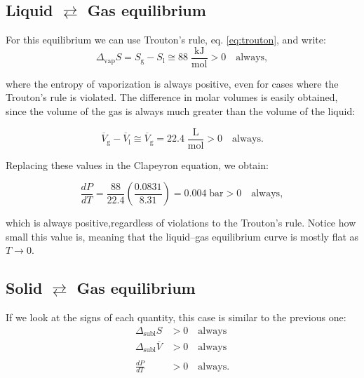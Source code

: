 \documentclass[
  9pt,
]{extbook}
\theoremstyle{definition}
\theoremstyle{definition}
\theoremstyle{definition}
\theoremstyle{definition}
\theoremstyle{remark}
\begin{document}
\subsection{\texorpdfstring{Liquid \(\rightleftarrows\) Gas equilibrium}{Liquid \textbackslash rightleftarrows Gas equilibrium}}\label{liquid-rightleftarrows-gas-equilibrium}

For this equilibrium we can use Trouton's rule, eq. \eqref{eq:trouton}, and write:
\begin{equation}
\Delta_{\text{vap}} S = S_{\text{g}}-S_{\text{l}} \cong 88 \; \frac{\text{kJ}}{\text{mol}} > 0\quad \text{always},
\label{eq:PTdia1}
\end{equation}

where the entropy of vaporization is always positive, even for cases where the Trouton's rule is violated. The difference in molar volumes is easily obtained, since the volume of the gas is always much greater than the volume of the liquid:

\begin{equation}
\overline{V}_{\text{g}} - \overline{V}_{\text{l}} \cong \overline{V}_{\text{g}} = 22.4\; \frac{\text{L}}{\text{mol}} >0\quad \text{always}.
\label{eq:PTdia2}
\end{equation}

Replacing these values in the Clapeyron equation, we obtain:

\begin{equation}
\frac{dP}{dT}=\frac{88}{22.4}\left( \frac{0.0831}{8.31} \right) = 0.004\;\text{bar} > 0 \quad \text{always},
\label{eq:PTdia3}
\end{equation}

which is always positive,regardless of violations to the Trouton's rule. Notice how small this value is, meaning that the liquid--gas equilibrium curve is mostly flat as \(T\rightarrow 0\).

\subsection{\texorpdfstring{Solid \(\rightleftarrows\) Gas equilibrium}{Solid \textbackslash rightleftarrows Gas equilibrium}}\label{solid-rightleftarrows-gas-equilibrium}

If we look at the signs of each quantity, this case is similar to the previous one:
\begin{equation}
\begin{aligned}
\Delta_{\text{subl}} S &> 0 \quad \text{always} \\
\Delta_{\text{subl}} \overline{V }&> 0 \quad \text{always} \\
\\
\frac{dP}{dT} &> 0 \quad \text{always}.
\end{aligned}
\label{eq:PTdi1}
\end{equation}
\end{document}
